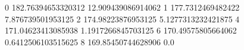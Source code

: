 0 182.76394653320312 12.909439086914062
1 177.7312469482422 7.876739501953125
2 174.98223876953125 5.1277313232421875
4 171.04623413085938 1.1917266845703125
6 170.49575805664062 0.6412506103515625
8 169.85450744628906 0.0

